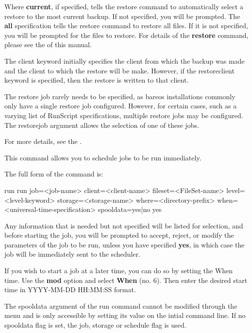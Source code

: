 \begin{description}
   Where {\bf current}, if specified, tells the restore command to
   automatically select a restore to the most current backup.  If not
   specified, you will be prompted.  The {\bf all} specification tells the
   restore command to restore all files.  If it is not specified, you will
   be prompted for the files to restore.  For details of the {\bf restore}
   command, please see the  of this
   manual.

   The client keyword initially specifies the client from which the backup
   was made and the client to which the restore will be make.  However,
   if the restoreclient keyword is specified, then the restore is written
   to that client.

   The restore job rarely needs to be specified, as bareos installations
   commonly only have a single restore job configured. However, for certain
   cases, such as a varying list of RunScript specifications, multiple
   restore jobs may be configured. The restorejob argument allows the
   selection of one of these jobs.

    For more details, see the .

\item [run]
   This command allows you to schedule jobs  to be run immediately.

   The full form of the command is:

\begin{bconsole}{run}
run job=<job-name> client=<client-name>
  fileset=<FileSet-name>  level=<level-keyword>
  storage=<storage-name>  where=<directory-prefix>
  when=<universal-time-specification> spooldata=yes|no yes
\end{bconsole}

   Any information that is needed but not specified will be listed for
   selection, and before starting the job, you will be prompted to accept,
   reject, or modify the parameters of the job to be run, unless you have
   specified {\bf yes}, in which case the job will be immediately sent to
   the scheduler.

   If you wish to start a job at a later time, you can do so by setting  the When
   time. Use the {\bf mod} option and select {\bf When} (no. 6).  Then enter the
   desired start time in YYYY-MM-DD HH:MM:SS format.

   The spooldata argument of the run command cannot be modified through the menu
   and is only accessible by setting its value on the intial command line. If
   no spooldata flag is set, the job, storage or schedule flag is used.


\end{description}
